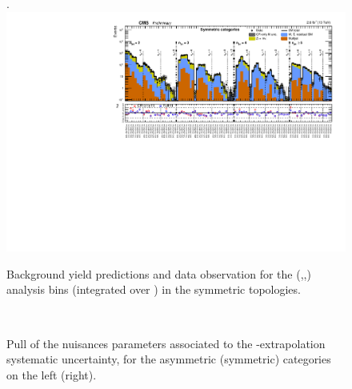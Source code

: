 \clearpage
\begin{landscape}
  \begin{center}
    \begin{figure}[h!]
      \caption{Background yield predictions and data observation for the (\njet,\nb,\scalht) analysis bins (integrated over \MHT) in the symmetric topologies. \label{fig:summaryPlot_Symmetric}}.
      \includegraphics[width=0.8\linewidth]{figures/postFitResults/summaryPlots/summaryPlot_Symmetric_prefit_overlay_fit_b_CRFit}
    \end{figure}
  \end{center}
\end{landscape}





\clearpage
\begin{figure}[tbhp]
    \caption{ Pull of the nuisances parameters associated to the \alt-extrapolation systematic uncertainty, 
      for the asymmetric (symmetric) categories on the left (right).
      \label{fig:nuisPull_AlphaT}}
  \begin{center}
     ~~
  \end{center}
\end{figure}

